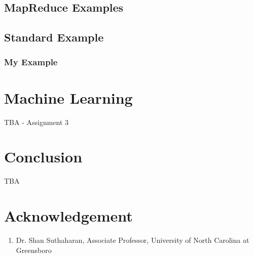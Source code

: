 \documentclass[twoside]{article}
\begin{document}
\subsection{MapReduce Examples}

\subsection{Standard Example}

\subsubsection{My Example}

\begin{multicols}{2} %


\section{Machine Learning}

TBA - Assignment 3


\section{Conclusion}

TBA


\section{Acknowledgement}

\begin{enumerate}
  \item Dr. Shan Suthaharan, Associate Professor, University of North Carolina at Greensboro
\end{enumerate}


\begin{thebibliography}{99} %


\end{thebibliography}
\end{multicols}
\end{document}
